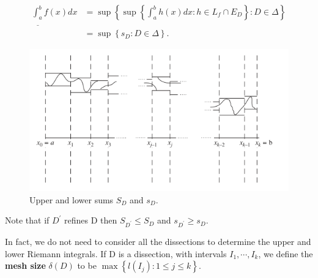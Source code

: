 \documentclass[12pt]{book}
\theoremstyle{definition}\newtheorem{dfn}{Définition}[chapter]
\theoremstyle{plain}\newtheorem{thm}{Théorème}[chapter]
\theoremstyle{plain}\newtheorem{prp}{Proposition}[chapter]
\theoremstyle{plain}\newtheorem{lem}{\bf Lemme}[chapter]
\theoremstyle{plain}\newtheorem{axm}{\bf Axiome}[chapter]
\theoremstyle{plain}\newtheorem{lmm}{\bf Lemme}[chapter]
\theoremstyle{plain}\newtheorem{cor}{\bf Corollaire}[chapter]
\theoremstyle{remark}\newtheorem{rem}{Remarque}[chapter]
\begin{document}
$$\begin{aligned}
\underline{\int^b_a}f(x) dx &=\sup\left\{\sup\left\{
\int^b_ah(x) dx : h \in L_f \cap E_D\right\} : D \in \Delta\right\}\\
&=\sup\left\{s_D : D \in \Delta\right\}.
\end{aligned}$$
\begin{figure}[H]
  \centering
  \includegraphics[width=0.8\linewidth]{image//Integration//1}
  \caption{Upper and lower sums $S_D$ and $s_D$.}
\end{figure}
Note that if $D^{\prime}$ refines D then $S_{D^{\prime}} \le S_D$ and $s_{D^{\prime}} \ge s_D$.

In fact, we do not need to consider all the dissections to determine the
upper and lower Riemann integrals. If D is a dissection, with intervals
$I_1, \cdots, I_k$, we define the {\bf mesh size} $\delta(D)$ to be $\max\left\{l(I_j) : 1 \le j \le k\right\}$.
\end{document}
